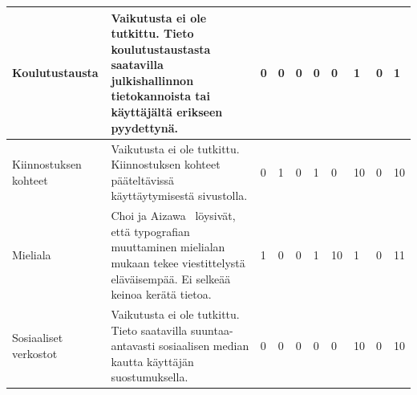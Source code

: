 \documentclass[finnish, 12pt, a4paper, elec, utf8, a-1b, online]{aaltothesis}
\begin{document}
{\begin{longtable}{p{2.5cm}|p{6cm}|p{0.5cm}p{0.5cm}p{0.5cm}|p{0.5cm}|p{0.5cm}p{0.5cm}p{0.5cm}|p{0.5cm}|}
    \midrule
    Koulutustausta                         & Vaikutusta ei ole tutkittu. Tieto koulutustaustasta saatavilla julkishallinnon tietokannoista tai käyttäjältä erikseen pyydettynä.                                                                                                                            & 0                                          & 0                                   & 0                                      & 0                            & 0                                               & 1                                         & 0                                         & 1                            \\
    \midrule
    Kiinnostuksen kohteet                  & Vaikutusta ei ole tutkittu. Kiinnostuksen kohteet pääteltävissä käyttäytymisestä sivustolla.                                                                                                                                                                  & 0                                          & 1                                   & 0                                      & 1                            & 0                                               & 10                                        & 0                                         & 10                           \\
    \midrule
    Mieliala                               & Choi ja Aizawa~\cite{choi_aizawa_2018} löysivät, että typografian muuttaminen mielialan mukaan tekee viestittelystä eläväisempää. Ei selkeää keinoa kerätä tietoa.                                                                                            & 1                                          & 0                                   & 0                                      & 1                            & 10                                              & 1                                         & 0                                         & 11                           \\
    \midrule
    Sosiaaliset verkostot                  & Vaikutusta ei ole tutkittu. Tieto saatavilla suuntaa-antavasti sosiaalisen median kautta käyttäjän suostumuksella.                                                                                                                                            & 0                                          & 0                                   & 0                                      & 0                            & 0                                               & 10                                        & 0                                         & 10                           \\

\end{longtable}}
\end{document}
